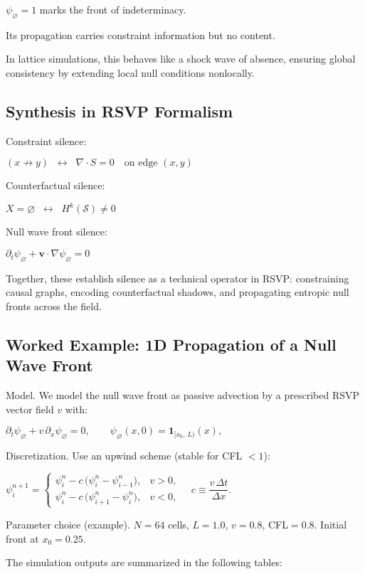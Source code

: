 \documentclass[12pt,a4paper]{article}
\begin{document}
$\psi_{\varnothing} = 1$ marks the front of indeterminacy.

Its propagation carries constraint information but no content.

In lattice simulations, this behaves like a shock wave of absence, ensuring global consistency by extending local null conditions nonlocally.

\subsection{Synthesis in RSVP Formalism}

Constraint silence:

$(x \not\to y) \;\; \leftrightarrow \;\; \nabla \cdot S = 0 \quad \text{on edge } (x,y)$

Counterfactual silence:

$X = \varnothing \;\; \leftrightarrow \;\; H^k(\mathcal{S}) \neq 0$

Null wave front silence:

$\partial_t \psi_{\varnothing} + \mathbf{v} \cdot \nabla \psi_{\varnothing} = 0$

Together, these establish silence as a technical operator in RSVP: constraining causal graphs, encoding counterfactual shadows, and propagating entropic null fronts across the field.

\subsection{Worked Example: 1D Propagation of a Null Wave Front}

Model. We model the null wave front as passive advection by a prescribed RSVP vector field $v$ with:

$\partial_t \psi_{\varnothing} + v\,\partial_x \psi_{\varnothing} = 0,\qquad
\psi_{\varnothing}(x,0) = \mathbf{1}_{[x_0,\,L)}(x),$

Discretization. Use an upwind scheme (stable for CFL $<1$):

$\psi_i^{n+1} =
\begin{cases}
\psi_i^n - c\,\big(\psi_i^n - \psi_{i-1}^n\big), & v>0,\\[4pt]
\psi_i^n - c\,\big(\psi_{i+1}^n - \psi_i^n\big), & v<0,
\end{cases}
\quad
c \equiv \dfrac{v\,\Delta t}{\Delta x}.$

Parameter choice (example). $N=64$ cells, $L=1.0$, $v=0.8$, CFL$=0.8$. Initial front at $x_0=0.25$.

The simulation outputs are summarized in the following tables:
\end{document}
